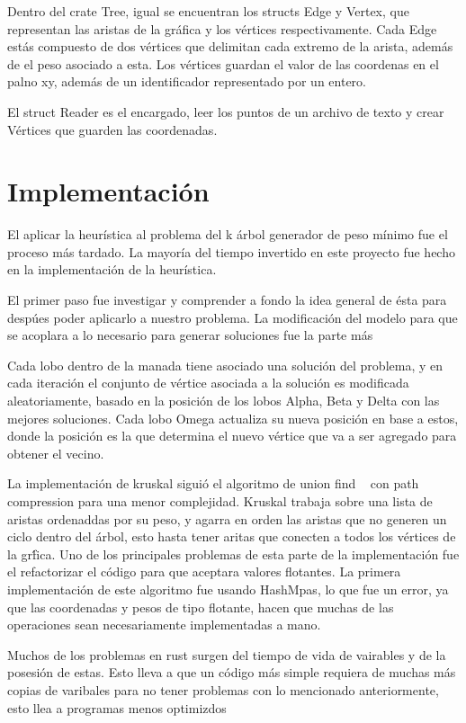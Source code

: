 \documentclass[a4paper]{article}
\begin{document}
Dentro del crate Tree, igual se encuentran los structs Edge y Vertex, que representan las aristas de
la gr\'afica y los v\'ertices respectivamente. Cada Edge est\'as compuesto de dos v\'ertices que
delimitan cada extremo de la arista, adem\'as de el peso asociado a esta. Los v\'ertices guardan el
valor de las coordenas en el palno xy, adem\'as de un identificador representado por un entero.

El struct Reader es el encargado, leer los puntos de un archivo de texto y crear V\'ertices que
guarden las coordenadas. 


\section*{Implementaci\'on}
El aplicar la heur\'istica al problema del k \'arbol generador de peso m\'inimo fue el proceso m\'as
tardado. La mayor\'ia del tiempo invertido en este proyecto fue hecho en la implementaci\'on de la
heur\'istica.

El primer paso fue investigar y comprender a fondo la idea general de \'esta para desp\'ues poder
aplicarlo a nuestro problema. La modificaci\'on del modelo para que se acoplara a lo necesario para
generar soluciones fue la parte m\'as 

 Cada lobo dentro de la manada tiene
asociado una soluci\'on del problema, y en cada iteraci\'on el conjunto de v\'ertice asociada a la
soluci\'on es modificada aleatoriamente, basado en la posici\'on de los lobos Alpha, Beta y Delta con las mejores soluciones. Cada lobo Omega actualiza su nueva posici\'on en base a estos, donde la
posici\'on es la que determina el nuevo v\'ertice que va a ser agregado para obtener el vecino.


La implementaci\'on de kruskal sigui\'o el algoritmo de union find ~\cite{unionFind} con path compression para una menor complejidad. Kruskal trabaja sobre una lista de aristas ordenaddas por su peso, y agarra en orden las aristas que no generen un ciclo dentro del \'arbol, esto hasta tener aritas que
conecten a todos los v\'ertices de la gr\'fica. Uno de los principales problemas de esta
parte de la implementaci\'on fue el refactorizar el c\'odigo para que aceptara valores flotantes. La primera implementaci\'on de este algoritmo fue usando HashMpas, lo que fue un error, ya que las
coordenadas y pesos de tipo flotante, hacen que muchas de las operaciones sean necesariamente implementadas a mano. 


Muchos de los problemas en rust surgen del tiempo de vida de vairables y de la posesi\'on de estas. Esto lleva a que un c\'odigo m\'as simple requiera de muchas m\'as copias de varibales para no tener
problemas con lo mencionado anteriormente, esto llea a programas menos optimizdos 
\end{document}
